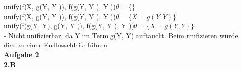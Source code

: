 \documentclass[a4paper, dvipsnames]{article}
\begin{document}
unify({\color{red}f}(X, g(Y, Y )), {\color{red}f}(g(Y, Y ), Y ))\quad$\theta = \{\}$\\
unify(f({\color{red}X}, g(Y, Y )), f({\color{red}g(Y, Y )}, Y ))\quad$\theta = \{X = g(Y, Y)\}$\\
unify(f(g(Y, Y), g(Y, Y )), f(g(Y, Y ), Y ))\quad$\theta = \{X = g(Y, Y)\}$\\ - Nicht unifizierbar, da Y im Term g(Y, Y) auftaucht. Beim unifizieren würde dies zu einer Endlosschleife führen.\\


\uline{\bfseries{Aufgabe 2}}\\
{\bfseries 2.B}\\
 \\
\end{document}
